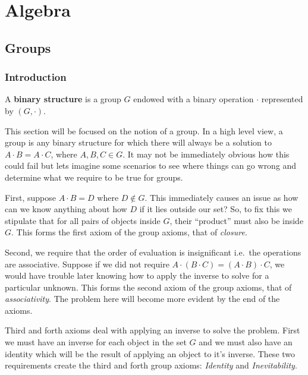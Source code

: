 \chapter{Algebra}

\section{Groups}

\subsection{Introduction}


\begin{defn}
\label{defn:binary_structure}
  A \textbf{binary structure} is a group $G$ endowed with a binary operation $\cdot$ represented by $(G, \cdot)$.
\end{defn}


This section will be focused on the notion of a group.
In a high level view, a group is any binary structure for which there will always be a solution to $ A\cdot B = A\cdot C $, where $A,B,C \in G$.
It may not be immediately obvious how this could fail but lets imagine some scenarios to see where things can go wrong and determine what we require to be true for groups.

First, suppose $A\cdot B = D$ where $D \not\in G$. This immediately causes an issue as how can we know anything about how $D$ if it lies outside our set?
So, to fix this we stipulate that for all pairs of objects inside $G$, their ``product'' must also be inside $G$. 
This forms the first axiom of the group axioms, that of \emph{closure}.

Second, we require that the order of evaluation is insignificant i.e.\ the operations are associative.
Suppose if we did not require $A \cdot ( B \cdot C) = (A \cdot B) \cdot C$, we would have trouble later knowing how to apply the inverse to solve for a particular unknown.
This forms the second axiom of the group axioms, that of \emph{associativity}.
The problem here will become more evident by the end of the axioms.

Third and forth axioms deal with applying an inverse to solve the problem.
First we must have an inverse for each object in the set $G$ and we must also have an identity which will be the result of applying an object to it's inverse.
These two requirements create the third and forth group axioms: \emph{Identity} and \emph{Inevitability}.

